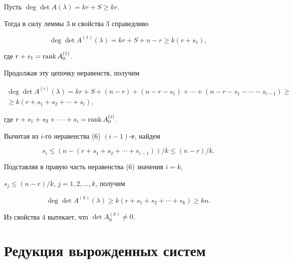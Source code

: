  


\begin{pf} Пусть $\deg\det A(\lambda)=kr+S\ge kr$. 


Тогда в силу леммы 3 и свойства 3 справедливо 


$$ 


\deg\det A^{(1)}(\lambda)=kr+S+n-r\ge k(r+s_1), 


$$ 


где $r+s_1=\operatorname{rank} A^{(1)}_0$. 


Продолжая эту цепочку неравенств, получим 


\begin{multline} 


\deg\det A^{(i)}(\lambda)=kr+S+(n-r)+(n-r-s_1)+\dotsb+ 


(n-r-s_1-\dotsb-s_{i-1})\ge \\


\ge k(r+s_1+s_2+\dotsb+s_i), 


\end{multline} 


где $r+s_1+s_2+\dotsb+s_i=\operatorname{rank} A^{(i)}_0$. 


Вычитая из $i$-го неравенства (6) $(i-1)$-е, найдем 


\begin{equation} 


s_i\le(n-(r+s_1+s_2+\dotsb+s_{i-1}))/k\le (n-r)/k. 


\end{equation} 


Подставляя в правую часть неравенства (6) значения $i=k$, 


$s_j\le(n-r)/k$, $j=1,2,\dotsc,k$, получим 


\begin{equation} 


\deg\det A^{(k)}(\lambda)\ge k(r+s_1+s_2+\dotsb+s_k)\ge kn. 


\end{equation} 


Из свойства 4 вытекает, что $\det A^{(k)}_0\ne 0$. 


\end{pf} 


 


\section{Редукция вырожденных систем} 


